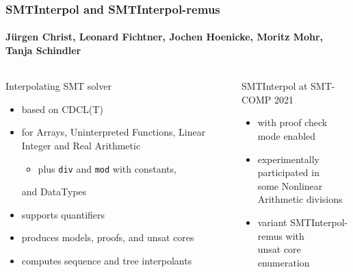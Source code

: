 \documentclass[table,aspectratio=169]{beamer}
\institute[Uni Freiburg]{University of Freiburg\hspace{1cm}\pgfuseimage{unifr}}
\begin{document}
\begin{frame}
  \frametitle{SMTInterpol and SMTInterpol-remus}
  \framesubtitle{J\"{u}rgen Christ, Leonard Fichtner, Jochen Hoenicke, Moritz Mohr, Tanja Schindler}
  
  \vspace{1ex}
  \begin{columns}[t]
  \begin{column}{.5\textwidth}
  Interpolating SMT solver
    \begin{itemize}
    \item based on CDCL(T)
      
    \item for Arrays, Uninterpreted Functions, Linear Integer and Real Arithmetic
    \begin{itemize}
      \item plus \texttt{div} and \texttt{mod} with constants,
    \end{itemize}
    and \alert{DataTypes}
    
    \item supports quantifiers
    
    \item produces models, proofs, and unsat cores
    
    \item computes sequence and tree interpolants
    \end{itemize}
  \end{column}
  
  \hfill\textcolor{ALUblue}{\vrule width 1pt }\hfill{}
  
  \begin{column}{.5\textwidth}
    SMTInterpol at SMT-COMP 2021
    \begin{itemize}
    \item with \alert{proof check mode enabled}
    
    \item experimentally participated in\\
    some \alert{Nonlinear Arithmetic} divisions
      
    \item variant SMTInterpol-remus with\\
    \alert{unsat core enumeration}
    \end{itemize}
  \end{column}
  \end{columns}
  \begin{center}
  \end{center}
\end{frame}
\end{document}

